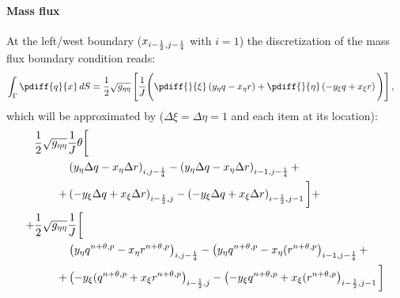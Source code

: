 \paragraph*{Mass flux}
At the left/west boundary ($x_{i-\frac{1}{2}, j-\frac{1}{4}}$ with $i=1$) the discretization of the mass flux boundary condition reads:
%
\begin{align}
    \int_\Gamma \pdiff{q}{x}\, dS
     & = \half \sqrt{g_{\eta\eta}} \left[ \frac{1}{J}\Bigg( \pdiff{}{\xi} \left( y_{\eta} q - x_{\eta} r \right) + \pdiff{}{\eta} \left( -y_{\xi} q + x_{\xi} r \right)\Bigg) \right],
\end{align}
which will be approximated by ($\Delta \xi = \Delta \eta = 1$ and each item at its location):
\begin{align}
    \frac{1}{2} \sqrt{g_{\eta\eta}} & \frac{1}{J} \theta \bigg[
    \nonumber \\
    & \left( y_{\eta} \Delta q - x_\eta \Delta r \right)_{i, j-\frac{1}{4}} - \left( y_{\eta} \Delta q - x_\eta \Delta r \right)_{i-1, j-\frac{1}{4}} +
    \nonumber \\
    + & \left(-y_{\xi} \Delta q + x_\xi \Delta r \right)_{i-\frac{1}{2}, j} - \left(-y_{\xi} \Delta q + x_\xi \Delta r \right)_{i-\frac{1}{2}, j-1}
    \bigg]
    +
    \\
    + \frac{1}{2} \sqrt{g_{\eta\eta}} & \frac{1}{J} \bigg[
    \nonumber \\
    & \left( y_{\eta} q^{n+\theta, p} - x_\eta r^{n+\theta, p} \right)_{i, j-\frac{1}{4}}
    -  \left( y_{\eta} q^{n+\theta, p} - x_\eta (r^{n+\theta, p} \right)_{i-1, j-\frac{1}{4}} +
    \nonumber \\
    + & \left(-y_{\xi} ( q^{n+\theta, p} + x_\xi r^{n+\theta, p} \right)_{i-\frac{1}{2}, j} - \left(-y_{\xi} q^{n+\theta, p}  + x_\xi (r^{n+\theta, p} \right)_{i-\frac{1}{2}, j-1}
    \bigg]
\end{align}
